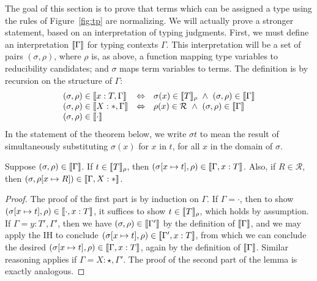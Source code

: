 \documentclass{article}
\begin{document}
The goal of this section is to prove that terms which can be assigned
a type using the rules of Figure~\ref{fig:tp} are normalizing.  We
will actually prove a stronger statement, based on an interpretation
of typing judgments.  First, we must define an interpretation
$\llbracket \Gamma \rrbracket$ for typing contexts $\Gamma$.  This interpretation
will be a set of pairs $(\sigma,\rho)$, where $\rho$ is, as above, a
function mapping type variables to reducibility candidates; and
$\sigma$ maps term variables to terms.  The definition is by recursion
on the structure of $\Gamma$:
\[
\begin{array}{lll}
(\sigma,\rho)\in\llbracket x:T,\Gamma \rrbracket & \Leftrightarrow & \sigma(x)\in\llbracket T \rrbracket_\rho \ \wedge\ (\sigma,\rho)\in\llbracket \Gamma \rrbracket \\
(\sigma,\rho)\in\llbracket X:*,\Gamma \rrbracket & \Leftrightarrow & \rho(x)\in\mathcal{R}\ \wedge\ (\sigma,\rho)\in\llbracket \Gamma \rrbracket \\
(\sigma,\rho)\in\llbracket \cdot \rrbracket
\end{array}
\]
In the statement of the theorem below, we write $\sigma t$ to mean the
result of simultaneously substituting $\sigma(x)$ for $x$ in $t$, for
all $x$ in the domain of $\sigma$.

\vspace{0.25cm}
\begin{lemma}
\label{lem:ctxtext}
  Suppose $(\sigma,\rho)\in\llbracket \Gamma \rrbracket$.  If
  $t\in\llbracket T \rrbracket_\rho$, then $(\sigma[x\mapsto
  t],\rho)\in\llbracket \Gamma,x:T \rrbracket$.  Also, if $R\in\mathcal{R}$, then
  $(\sigma,\rho[x\mapsto R])\in\llbracket \Gamma,X:* \rrbracket$.
\end{lemma}
\begin{proof}
  The proof of the first part is by induction on $\Gamma$. If $\Gamma
  = \cdot$, then to show $(\sigma[x\mapsto
  t],\rho)\in\llbracket \cdot,x:T \rrbracket$, it suffices to show
  $t\in\llbracket T \rrbracket_\rho$, which holds by assumption.  If $\Gamma =
  y:T',\Gamma'$, then we have $(\sigma,\rho)\in\llbracket \Gamma' \rrbracket$ by
  the definition of $\llbracket \Gamma \rrbracket$, and we may apply the IH to
  conclude $(\sigma[x\mapsto t],\rho)\in\llbracket \Gamma',x:T \rrbracket$, from
  which we can conclude the desired $(\sigma[x\mapsto
  t],\rho)\in\llbracket \Gamma,x:T \rrbracket$, again by the definition of
  $\llbracket \Gamma \rrbracket$.  Similar reasoning applies if $\Gamma =
  X:\star,\Gamma'$.  The proof of the second part of the lemma
  is exactly analogous.
\end{proof}
\end{document}
